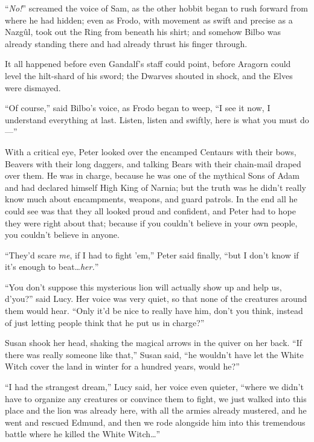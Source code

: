 “\emph{No!}” screamed the voice of Sam, as the other hobbit began to rush forward from where he had hidden; even as Frodo, with movement as swift and precise as a Nazgûl, took out the Ring from beneath his shirt; and somehow Bilbo was already standing there and had already thrust his finger through.

It all happened before even Gandalf’s staff could point, before Aragorn could level the hilt-shard of his sword; the Dwarves shouted in shock, and the Elves were dismayed.

“Of course,” said Bilbo’s voice, as Frodo began to weep, “I see it now, I understand everything at last. Listen, listen and swiftly, here is what you must do—”


With a critical eye, Peter looked over the encamped Centaurs with their bows, Beavers with their long daggers, and talking Bears with their chain-mail draped over them. He was in charge, because he was one of the mythical Sons of Adam and had declared himself High King of Narnia; but the truth was he didn’t really know much about encampments, weapons, and guard patrols. In the end all he could see was that they all looked proud and confident, and Peter had to hope they were right about that; because if you couldn’t believe in your own people, you couldn’t believe in anyone.

“They’d scare \emph{me}, if I had to fight ’em,” Peter said finally, “but I don’t know if it’s enough to beat…\emph{her.}”

“You don’t suppose this mysterious lion will actually show up and help us, d’you?” said Lucy. Her voice was very quiet, so that none of the creatures around them would hear. “Only it’d be nice to really have him, don’t you think, instead of just letting people think that he put us in charge?”

Susan shook her head, shaking the magical arrows in the quiver on her back. “If there was really someone like that,” Susan said, “he wouldn’t have let the White Witch cover the land in winter for a hundred years, would he?”

“I had the strangest dream,” Lucy said, her voice even quieter, “where we didn’t have to organize any creatures or convince them to fight, we just walked into this place and the lion was already here, with all the armies already mustered, and he went and rescued Edmund, and then we rode alongside him into this tremendous battle where he killed the White Witch…”

